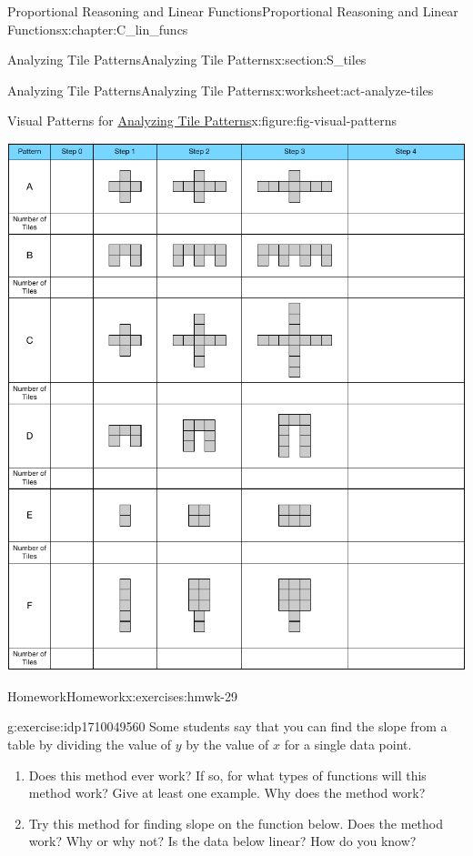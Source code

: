 \documentclass[oneside,10pt,]{book}
\numberwithin{equation}{chapter}
\begin{document}
\begin{chapterptx}{Proportional Reasoning and Linear Functions}{}{Proportional Reasoning and Linear Functions}{}{}{x:chapter:C_lin_funcs}
\begin{sectionptx}{Analyzing Tile Patterns}{}{Analyzing Tile Patterns}{}{}{x:section:S_tiles}
\begin{worksheet-subsection}{Analyzing Tile Patterns}{}{Analyzing Tile Patterns}{}{}{x:worksheet:act-analyze-tiles}
\begin{figureptx}{Visual Patterns for \hyperref[x:worksheet:act-analyze-tiles]{Analyzing Tile Patterns}}{x:figure:fig-visual-patterns}{}
\begin{image}{0}{1}{0}
\includegraphics[width=\linewidth]{external/visual-patterns.pdf}
\end{image}%
\tcblower
\end{figureptx}%
\end{worksheet-subsection}
\restoregeometry
%
%
\typeout{************************************************}
\typeout{************************************************}
%
\begin{exercises-subsection}{Homework}{}{Homework}{}{}{x:exercises:hmwk-29}
\begin{divisionexercise}{1}{}{}{g:exercise:idp1710049560}%
Some students say that you can find the slope from a table by dividing the value of \(y\) by the value of \(x\) for a single data point.%
\begin{enumerate}[font=\bfseries,label=(\alph*),ref=\alph*]
\item{}Does this method ever work? If so, for what types of functions will this method work? Give at least one example. Why does the method work?%
\item{}Try this method for finding slope on the function below. Does the method work? Why or why not? Is the data below linear? How do you know?%

\end{enumerate}
\end{divisionexercise}
\end{exercises-subsection}
\end{sectionptx}
\end{chapterptx}
\end{document}
